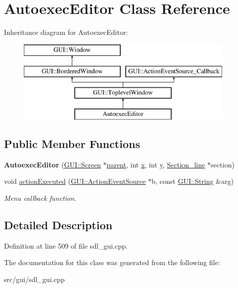\hypertarget{classAutoexecEditor}{\section{Autoexec\-Editor Class Reference}
\label{classAutoexecEditor}
}
Inheritance diagram for Autoexec\-Editor\-:\begin{figure}[H]
\begin{center}
\leavevmode
\includegraphics[height=4.000000cm]{classAutoexecEditor}
\end{center}
\end{figure}
\subsection*{Public Member Functions}
\begin{DoxyCompactItemize}
\item 
\hypertarget{classAutoexecEditor_ae2c55e6e3715432d9c394f1dec2f4255}{{\bfseries Autoexec\-Editor} (\hyperlink{classGUI_1_1Screen}{G\-U\-I\-::\-Screen} $\ast$\hyperlink{classGUI_1_1Window_a2e593ff65e7702178d82fe9010a0b539}{parent}, int \hyperlink{classGUI_1_1Window_a6ca6a80ca00c9e1d8ceea8d3d99a657d}{x}, int \hyperlink{classGUI_1_1Window_a0ee8e923aff2c3661fc2e17656d37adf}{y}, \hyperlink{classSection__line}{Section\-\_\-line} $\ast$section)}\label{classAutoexecEditor_ae2c55e6e3715432d9c394f1dec2f4255}

\item 
\hypertarget{classAutoexecEditor_a5103a2bb5e750230a808ce091448ed05}{void \hyperlink{classAutoexecEditor_a5103a2bb5e750230a808ce091448ed05}{action\-Executed} (\hyperlink{classGUI_1_1ActionEventSource}{G\-U\-I\-::\-Action\-Event\-Source} $\ast$b, const \hyperlink{classGUI_1_1String}{G\-U\-I\-::\-String} \&arg)}\label{classAutoexecEditor_a5103a2bb5e750230a808ce091448ed05}

\begin{DoxyCompactList}\small\item\em Menu callback function. \end{DoxyCompactList}\end{DoxyCompactItemize}


\subsection{Detailed Description}


Definition at line 509 of file sdl\-\_\-gui.\-cpp.



The documentation for this class was generated from the following file\-:\begin{DoxyCompactItemize}
\item 
src/gui/sdl\-\_\-gui.\-cpp\end{DoxyCompactItemize}
